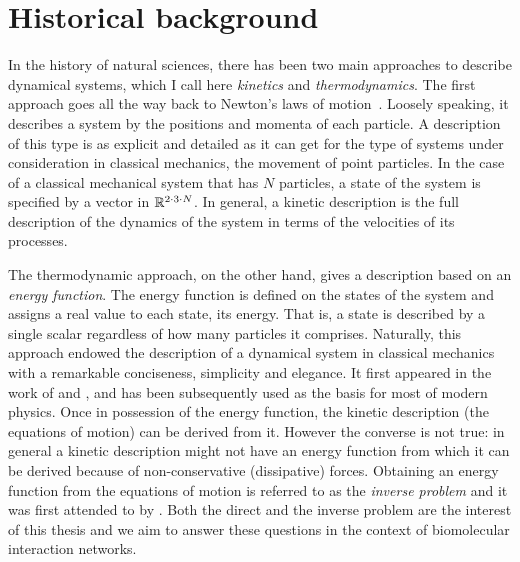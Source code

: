% 
\section{Historical background}
\label{sec:bg}

In the history of natural sciences,
there has been two main approaches to describe dynamical systems,
which I call here
\emph{kinetics} and \emph{thermodynamics}.
The first approach goes all the way back to
Newton's laws of motion~\citep{newton}.
Loosely speaking, it describes a system by
the positions and momenta of each particle.
A description of this type is as explicit and detailed as it can get
for the type of systems under consideration in classical mechanics,
\ie the movement of point particles.
In the case of a classical mechanical system that has $N$ particles,
a state of the system is specified by
a vector in $\mathbb{R}^{2 \cdot 3 \cdot N}$.
In general, a kinetic description is the full description of the
dynamics of the system in terms of the velocities of its processes.

The thermodynamic approach, on the other hand,
gives a description based on an \emph{energy function}.
The energy function is defined on the states of the system
and assigns a real value to each state, its energy.
That is, a state is described by a single scalar
regardless of how many particles it comprises.
Naturally, this approach endowed the description of
a dynamical system in classical mechanics
with a remarkable conciseness, simplicity and elegance.
It first appeared in the work of
\citet{lagrange2} and \citet{hamilton},
and has been subsequently used as the basis for most of modern physics.
Once in possession of the energy function,
the kinetic description (\ie the equations of motion)
can be derived from it.
However the converse is not true:
in general a kinetic description might not have an energy function
from which it can be derived \citep{santilli}
because of non-conservative (dissipative) forces.
Obtaining an energy function from the equations of motion
is referred to as the \emph{inverse problem} %
and it was first attended to by \citet{helmholtz}.
Both the direct and the inverse problem are the interest of this thesis
and we aim to answer these questions
in the context of biomolecular interaction networks.

